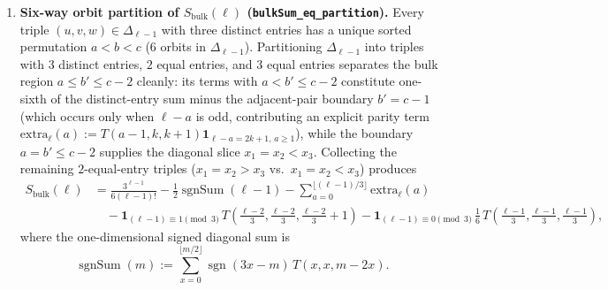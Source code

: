 \documentclass[11pt,a4paper]{article}
\numberwithin{equation}{section}
\theoremstyle{plain}
\theoremstyle{definition}
\theoremstyle{remark}
\DeclareMathOperator{\sgn}{sgn}
\newcommand{\code}[1]{\texttt{\small #1}}
\begin{document}
\begin{enumerate}[label=(\alph*)]
  \item \textbf{Six-way orbit partition of $S_{\mathrm{bulk}}(\ell)$ (\code{bulkSum\_eq\_partition}).} Every triple $(u,v,w)\in\Delta_{\ell-1}$ with three distinct entries has a unique sorted permutation $a<b<c$ (6 orbits in $\Delta_{\ell-1}$). Partitioning $\Delta_{\ell-1}$ into triples with $3$ distinct entries, $2$ equal entries, and $3$ equal entries separates the bulk region $a\le b'\le c-2$ cleanly: its terms with $a<b'\le c-2$ constitute one-sixth of the distinct-entry sum minus the adjacent-pair boundary $b'=c-1$ (which occurs only when $\ell-a$ is odd, contributing an explicit parity term $\mathrm{extra}_\ell(a):=T(a-1,k,k+1)\mathbf{1}_{\ell-a=2k+1,\,a\ge 1}$), while the boundary $a=b'\le c-2$ supplies the diagonal slice $x_1=x_2<x_3$. Collecting the remaining $2$-equal-entry triples ($x_1=x_2>x_3$ vs.\ $x_1=x_2<x_3$) produces
  \begin{align*}
    S_{\mathrm{bulk}}(\ell)
    &= \frac{3^{\ell-1}}{6(\ell-1)!}
       - \frac{1}{2}\operatorname{sgnSum}(\ell-1)
       - \sum_{a=0}^{\lfloor(\ell-1)/3\rfloor}\mathrm{extra}_\ell(a)\\
    &\quad - \mathbf{1}_{(\ell-1)\equiv 1\pmod 3}\,T\!\left(\tfrac{\ell-2}{3},\tfrac{\ell-2}{3},\tfrac{\ell-2}{3}+1\right)
       - \mathbf{1}_{(\ell-1)\equiv 0\pmod 3}\,\frac{1}{6}\,T\!\left(\tfrac{\ell-1}{3},\tfrac{\ell-1}{3},\tfrac{\ell-1}{3}\right),
  \end{align*}
  where the one-dimensional signed diagonal sum is
  \begin{equation}\label{eq:sgnSum-def}
    \operatorname{sgnSum}(m) := \sum_{x=0}^{\lfloor m/2\rfloor} \sgn(3x - m)\,T(x,x,m-2x).
  \end{equation}


\end{enumerate}
\end{document}
